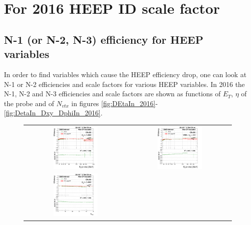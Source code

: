 
\section{For 2016 HEEP ID scale factor}
\label{AppHEEPsf_2016}
\subsection{N-1 (or N-2, N-3) efficiency for HEEP variables}
\label{AppHEEPsf_N_1_2016}
In order to find variables which cause the HEEP efficiency drop, one can look at N-1 or N-2 efficiencies and scale factors for various HEEP variables.
In 2016 the N-1, N-2 and N-3 efficiencies and scale factors are shown as functions of $E_T$, $\eta$ of the probe and of $N_{vtx}$ in figures \ref{fig:DEtaIn_2016}-\ref{fig:DetaIn_Dxy_DphiIn_2016}.

\begin{figure}[bh]
  \begin{center}
    \begin{tabular}{cc}
      \includegraphics[width=0.45\textwidth]{figures/Zprime/2016/ScaleFactor/SameSign/N_1_eff/g_compare_cut_Et_Barrel_ea_ta_inc_AS_N_1_DEtaIn_PUW.png} &
      \includegraphics[width=0.45\textwidth]{figures/Zprime/2016/ScaleFactor/SameSign/N_1_eff/g_compare_cut_Et_Endcap_ea_ta_inc_AS_N_1_DEtaIn_PUW.png} \\
      \includegraphics[width=0.45\textwidth]{figures/Zprime/2016/ScaleFactor/SameSign/N_1_eff/g_compare_cut_nVtx_Barrel_ea_ta_inc_AS_N_1_DEtaIn_PUW.png} &

\end{tabular}
\end{center}
\end{figure}
